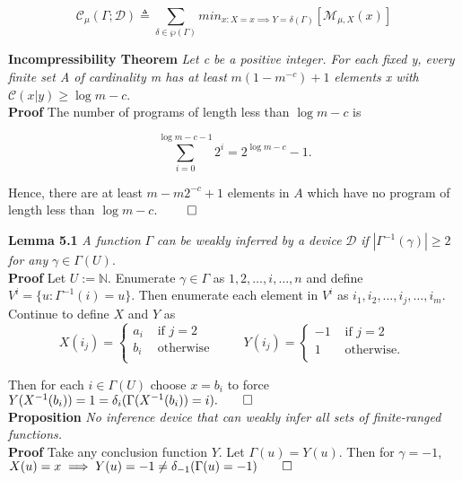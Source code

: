 \documentclass[11pt]{article}
\newcommand{\N}{\mathbb{N}}
\begin{document}
$$ \mathcal{C}_{\mu}(\Gamma ; \mathcal{D}) \triangleq \sum_{\delta \in \wp(\Gamma)} min_{x : X = x \implies Y = \delta(\Gamma) } [\mathcal{M}_{\mu, X} (x)]	$$ 

\textbf{Incompressibility Theorem} \quad \textit{Let c be a positive integer. For each fixed y, every finite set A of cardinality m has at least} $ m(1 - m^{-c}) + 1 $ \textit{elements x with} $ \mathcal{C}(x|y) \geq \log m - c $. \\

\textbf{Proof} \quad The number of programs of length less than $ \log m - c $ is 

$$ \sum_{i = 0}^{\log m - c - 1} {2^i} = 2^{\log m - c} - 1. $$

Hence, there are at least $ m - m2^{-c} + 1 $ elements in $ A $ which have no program of length less than $ \log m - c $. $ \hfill \qed $ \\


\bigskip
\bigskip

\textbf{Lemma 5.1} \; \textit{A function} $ \Gamma $ \textit{can be weakly inferred by a device} $ \mathcal{D} $ \textit{if} $ |\Gamma^{-1}(\gamma)| \geq 2 $ \textit{for any} $ \gamma \in \Gamma(U) $. \\
\textbf{Proof} \; Let $ U := \N $. Enumerate $ \gamma \in \Gamma $ as $ 1, 2, \dots, i, \dots, n $ and define $ V^{i} = \{u: \Gamma^{-1}(i) = u \} $. Then enumerate each element in $ V^i $ as $ i_1, i_2, \dots, i_j, \dots, i_m $. Continue to define $ X $ and $ Y $ as 
\begin{equation*}
X(i_j) = \begin{cases}
       a_i & \text{ if } j = 2 \\
       b_i & \text{ otherwise } \\
       \end{cases} \quad \quad 
Y(i_j) = \begin{cases}
       -1 & \text{ if } j = 2 \\
       1 & \text{ otherwise. } \\
       \end{cases} 
\end{equation*}

Then for each $ i \in \Gamma(U) $ choose $ x = b_i $ to force $ Y(X^{-1}(b_i)) = 1 = \delta_{i}(\Gamma(X^{-1}(b_i)) = i). \hfill \qed $ \\

\bigskip
\textbf{Proposition} \quad \textit{No inference device that can weakly infer all sets of finite-ranged functions.} \\
\textbf{Proof} \quad Take any conclusion function $ Y $. Let $\Gamma(u) = Y(u) $. Then for $ \gamma = -1 $, $ X(u) = x \implies Y(u) = -1 \neq \delta_{-1}(\Gamma(u) = -1) \hfill \qed $  \\
\end{document}
